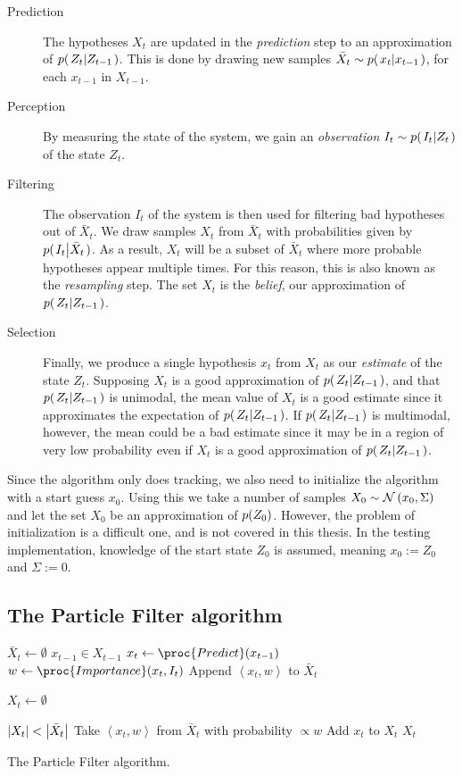 \begin{description}
\item[Prediction] The hypotheses $X_t$ are updated in the \emph{prediction} step to an approximation of $p{(\left. Z_t \middle\vert Z_{t-1} \right.)}$. This is done by drawing new samples $\bar{X}_t \sim p{(\left. x_t \middle\vert x_{t-1} \right.)}$, for each $x_{t-1}$ in $X_{t-1}$.
\item[Perception] By measuring the state of the system, we gain an \emph{observation} $I_t \sim p{(\left. I_t \middle\vert Z_t \right.)}$ of the state $Z_t$.
\item[Filtering] The observation $I_t$ of the system is then used for filtering bad hypotheses out of $\bar{X}_t$. We draw samples $X_t$ from $\bar{X}_t$ with probabilities given by $p{(\left. I_t \middle\vert \bar{X}_t \right.)}$. As a result, $X_t$ will be a subset of $\bar{X}_t$ where more probable hypotheses appear multiple times. For this reason, this is also known as the \emph{resampling} step. The set $X_t$ is the \emph{belief}, our approximation of $p{(\left. Z_t \middle\vert Z_{t-1} \right.)}$.
\item[Selection] Finally, we produce a single hypothesis $x_t$ from $X_t$ as our \emph{estimate} of the state $Z_t$. Supposing $X_t$ is a good approximation of $p{(\left. Z_t \middle\vert Z_{t-1} \right.)}$, and that $p{(\left. Z_t \middle\vert Z_{t-1} \right.)}$ is unimodal, the mean value of $X_t$ is a good estimate since it approximates the expectation of $p{(\left. Z_t \middle\vert Z_{t-1} \right.)}$. If $p{(\left. Z_t \middle\vert Z_{t-1} \right.)}$ is multimodal, however, the mean could be a bad estimate since it may be in a region of very low probability even if $X_t$ is a good approximation of $p{(\left. Z_t \middle\vert Z_{t-1} \right.)}$.
\end{description}

Since the algorithm only does tracking, we also need to initialize the algorithm with a start guess $x_0$. Using this we take a number of samples $X_0 \sim \mathcal{N}\left(x_0, \Sigma\right)$ and let the set $X_0$ be an approximation of $p{(Z_0)}$. However, the problem of initialization is a difficult one\cite{Hedvig}, and is not covered in this thesis. In the testing implementation, knowledge of the start state $Z_0$ is assumed, meaning $x_0 := Z_0$ and $\Sigma := 0$.



\subsection{The Particle Filter algorithm}
\begin{table}
  \begin{codebox}
    \li $\bar{X}_t \gets \emptyset$
    \li \ForEach $x_{t-1} \in X_{t-1}$
    \li \Do
    \li $x_t \gets \proc{Predict}(x_{t-1})$
    \li $w \gets \proc{Importance}(x_t,I_t)$
    \li Append $\left<x_t, w\right>$ to $\bar{X}_t$
    \End
    \li
    
    \li $X_t \gets \emptyset$
    
    \li \While $\left\vert X_t \right\vert < \left\vert \bar{X}_t \right\vert$
    \li \Do
    \li Take $\left<x_t, w\right>$ from $\bar{X}_t$ with probability $\propto w$
    \li Add $x_t$ to $X_t$
    \End
    \li \Return $X_t$
  \end{codebox}
  \caption{The Particle Filter algorithm.}
  \label{pf-algorithm}
\end{table}

